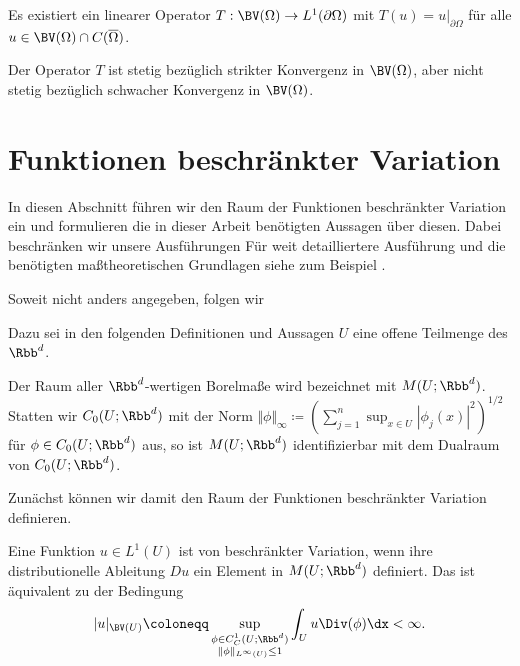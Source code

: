 \begin{theorem}[Spuroperator]
  \label{thm:traceOperator}
  Es existiert ein linearer Operator $T:\BV(\Omega)\to L^1(\partial\Omega)$
  mit $T(u) = u|_{\partial\Omega}$ für alle $u\in\BV(\Omega)\cap
  C(\overline\Omega)$.

  Der Operator $T$ ist stetig bezüglich strikter Konvergenz in $\BV(\Omega)$,
  aber nicht stetig bezüglich schwacher Konvergenz in $\BV(\Omega)$. 
\end{theorem}




\section{Funktionen beschränkter Variation}

In diesen Abschnitt führen wir den Raum der Funktionen beschränkter Variation
ein und formulieren die in dieser Arbeit benötigten Aussagen über diesen.
Dabei beschränken wir unsere Ausführungen 
Für weit detailliertere Ausführung und die benötigten
maßtheoretischen Grundlagen siehe zum Beispiel \cite{ABM14, EG92, Bra98}. 

Soweit nicht anders angegeben, folgen wir \cite[S. 393]{ABM14}

Dazu sei in den folgenden Definitionen und Aussagen $U$ eine offene Teilmenge
des $\Rbb^d$.

Der Raum aller $\Rbb^d$-wertigen Borelmaße wird bezeichnet mit
$M(U;\Rbb^d)$.
Statten wir $C_0(U;\Rbb^d)$ mit der Norm $\Vert\phi\Vert_\infty\coloneqq
(\sum_{j=1}^n\sup_{x\in U}|\phi_j(x)|^2)^{1/2}$ für $\phi\in C_0(U;\Rbb^d)$ 
aus, so ist $M(U;\Rbb^d)$ identifizierbar mit dem Dualraum von $C_0(U;\Rbb^d)$.

Zunächst können wir damit den Raum der Funktionen beschränkter Variation
definieren.

\begin{definition}
  Eine Funktion $u\in L^1(U)$ ist von beschränkter Variation, wenn ihre
  distributionelle Ableitung $Du$ ein Element in $M(U;\Rbb^d)$ definiert. Das 
  ist äquivalent zu der Bedingung
  \begin{align}
    \label{eq:boundedVariation}
    |u|_{\BV(U)}
    \coloneqq
    \sup_{\substack{\phi\in C^1_C(U;\Rbb^d)\\
    \Vert\phi\Vert_{L^\infty(U)}\leq 1}}\int_U u\Div (\phi)\dx
    <
    \infty.
  \end{align}
\end{definition}

